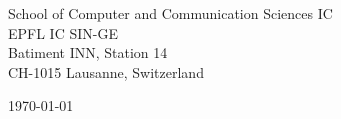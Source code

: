 \begin{minipage}{0.49\textwidth}
\begin{flushleft}
\noindent 
School of Computer and Communication Sciences IC \\
EPFL IC SIN-GE \\
Batiment INN, Station 14 \\
CH-1015 Lausanne, Switzerland
\end{flushleft}
\end{minipage}
\begin{minipage}{0.47\textwidth}
\begin{flushright}
\today
\end{flushright}
\end{minipage} \\

\newcommand{\univ}{Ecole Polytechnique Federale de Lausanne}
\newcommand{\univshort}{EPFL}
\newcommand{\degree}{M.Sc.}
\newcommand{\dept}{Computer Science}
